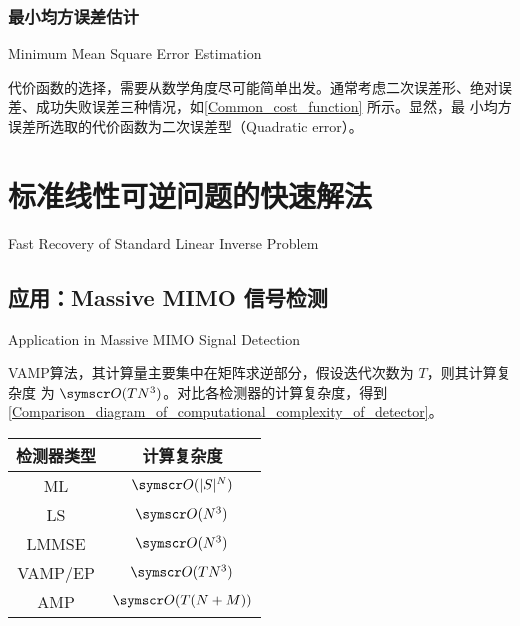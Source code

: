 \documentclass[type=master]{../gdutthesis}
\newcommand{\mscr}{\symscr}
\begin{document}
\subsection{最小均方误差估计}{Minimum Mean Square Error Estimation}

代价函数的选择，需要从数学角度尽可能简单出发。通常考虑二次误差形、绝对误
差、成功失败误差三种情况，如\autoref{Common_cost_function} 所示。显然，最
小均方误差所选取的代价函数为二次误差型（Quadratic error）。

\begin{figure}[htbp]
  \quad
  \quad
  \label{Common_cost_function}
\end{figure}

\chapter{标准线性可逆问题的快速解法}{Fast Recovery of Standard Linear Inverse Problem}
\section{应用：Massive MIMO 信号检测}{Application in Massive MIMO Signal Detection}

VAMP算法，其计算量主要集中在矩阵求逆部分，假设迭代次数为 $T$，则其计算复杂度
为 $\mscr O(TN^3)$。对比各检测器的计算复杂度，得到\autoref{Comparison_diagram_of_computational_complexity_of_detector}。

\begin{table}[htbp]
  \label{Comparison_diagram_of_computational_complexity_of_detector}
  \begin{tabular}{cc}
    \toprule
    检测器类型 & 计算复杂度 \\
    \midrule
    ML        & $\mscr O(|S|^N)$ \\
    LS        & $\mscr O(N^3)$   \\
    LMMSE     & $\mscr O(N^3)$   \\
    VAMP/EP   & $\mscr O(TN^3)$   \\
    AMP       & $\mscr O(T(N+M))$   \\
    \bottomrule
    \end{tabular}
\end{table}
\end{document}
